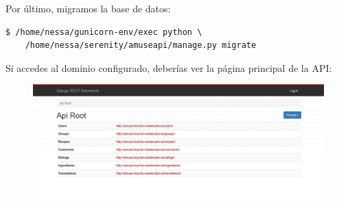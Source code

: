 Por último, migramos la base de datos:

\begin{verbatim}
$ /home/nessa/gunicorn-env/exec python \
    /home/nessa/serenity/amuseapi/manage.py migrate
\end{verbatim}

Si accedes al dominio configurado, deberías ver la página principal de la API:

\begin{figure}[htbp]
  \centering
  \includegraphics[width=\textwidth]{apen1/img/api}
  \caption{}
  \label{fig:api-web}
\end{figure}
